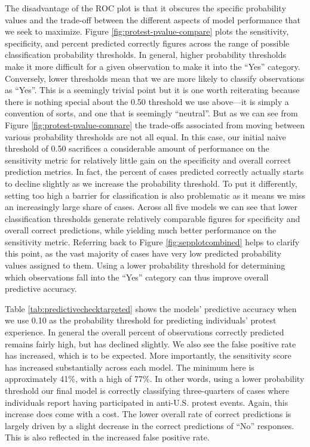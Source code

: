The disadvantage of the ROC plot is that it obscures the specific probability values and the trade-off between the different aspects of model performance that we seek to maximize. Figure \ref{fig:protest-pvalue-compare} plots the sensitivity, specificity, and percent predicted correctly figures across the range of possible classification probability thresholds. In general, higher probability thresholds make it more difficult for a given observation to make it into the ``Yes'' category. Conversely, lower thresholds mean that we are more likely to classify observations as ``Yes''. This is a seemingly trivial point but it is one worth reiterating because there is nothing special about the 0.50 threshold we use above---it is simply a convention of sorts, and one that is seemingly ``neutral''. But as we can see from Figure \ref{fig:protest-pvalue-compare} the trade-offs associated from moving between various probability thresholds are not all equal. In this case, our initial naive threshold of 0.50 sacrifices a considerable amount of performance on the sensitivity metric for relatively little gain on the specificity and overall correct prediction metrics. In fact, the percent of cases predicted correctly actually starts to decline slightly as we increase the probability threshold. To put it differently, setting too high a barrier for classification is also problematic as it means we miss an increasingly large share of cases. Across all five models we can see that lower classification thresholds generate relatively comparable figures for specificity and overall correct predictions, while yielding much better performance on the sensitivity metric. Referring back to Figure \ref{fig:sepplotcombined} helps to clarify this point, as the vast majority of cases have very low predicted probability values assigned to them. Using a lower probability threshold for determining which observations fall into the ``Yes'' category can thus improve overall predictive accuracy.




Table \ref{tab:predictivechecktargeted} shows the models' predictive accuracy when we use 0.10 as the probability threshold for predicting individuals' protest experience. In general the overall percent of observations correctly predicted remains fairly high, but has declined slightly. We also see the false positive rate has increased, which is to be expected. More importantly, the sensitivity score has increased substantially across each model. The minimum here is approximately 41\%, with a high of 77\%. In other words, using a lower probability threshold our final model is correctly classifying three-quarters of cases where individuals report having participated in anti-U.S. protest events. Again, this increase does come with a cost. The lower overall rate of correct predictions is largely driven by a slight decrease in the correct predictions of ``No'' responses. This is also reflected in the increased false positive rate. 

